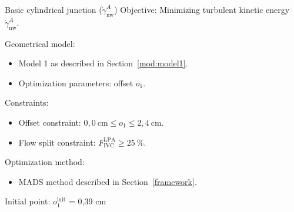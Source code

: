 \begin{optimproblem}{Basic cylindrical junction ($\dot{\gamma}^{A}_{\text{nw}}$)}
	\vspace{2mm}
	Objective: Minimizing turbulent kinetic energy $\dot{\gamma}^{A}_{\text{nw}}$.
	
	\vspace{2mm}
	Geometrical model:
	\begin{itemize}
		\item Model 1 as described in Section~\ref{mod:model1}.
		\item Optimization parameters: offset $o_1$.
	\end{itemize}
	Constraints:
	\begin{itemize}
		\item Offset constraint: $0{,}0~\text{cm} \leq o_1 \leq 2{,}4~\text{cm}$.
		\item Flow split constraint: $F^{\text{LPA}}_{\text{IVC}} \geq 25~\%$.
	\end{itemize}
	Optimization method:
	\begin{itemize}
		\item MADS method described in Section~\ref{framework}.
	\end{itemize}
	Initial point: $o^{\text{init}}_{1}$ = 0{,}39 cm
	\label{optimprob:3}
\end{optimproblem}
\vspace{-5mm}

